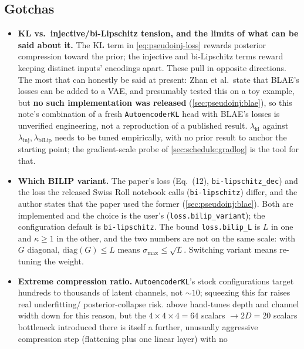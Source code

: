 \subsection{Gotchas}
\label{sec:pseudoinj:gotchas}
\begin{itemize}[leftmargin=1.5em]
\item \textbf{KL vs.\ injective/bi-Lipschitz tension, and the limits of what can be said about it.} The
      KL term in \cref{eq:pseudoinj-loss} rewards posterior compression toward the prior; the injective and
      bi-Lipschitz terms reward keeping distinct inputs' encodings apart. These pull in opposite
      directions. The most that can honestly be said at present: Zhan et al.\ state that BLAE's losses can
      be added to a VAE, and presumably tested this on a toy example, but \textbf{no such implementation
      was released} (\cref{sec:pseudoinj:blae}), so this note's combination of a fresh
      \texttt{AutoencoderKL} head with BLAE's losses is unverified engineering, not a reproduction of a
      published result. $\lambda_{\mathrm{kl}}$ against $\lambda_{\mathrm{inj}},\lambda_{\mathrm{biLip}}$
      needs to be tuned empirically, with no prior result to anchor the starting point; the gradient-scale
      probe of \cref{sec:schedule:gradlog} is the tool for that.
\item \textbf{Which BILIP variant.} The paper's loss (Eq.~(12), \texttt{bi-lipschitz\_dec})
      and the loss the released Swiss Roll notebook calls (\texttt{bi-lipschitz}) differ,
      and the author states that the paper used the former (\cref{sec:pseudoinj:blae}).
      Both are implemented and the choice is the user's
      (\texttt{loss.bilip\_variant}); the configuration default is \texttt{bi-lipschitz}.
      The bound \texttt{loss.bilip\_L} is $L$ in one and $\kappa\ge1$ in the other, and the
      two numbers are not on the same scale: with $G$ diagonal, $\mathrm{diag}(G)\le L$
      means $\sigma_{\max}\le\sqrt{L}$. Switching variant means re-tuning the weight.
\item \textbf{Extreme compression ratio.} \texttt{AutoencoderKL}'s stock configurations target hundreds 
      to thousands of latent channels, not $\sim\!10$; squeezing this far raises real underfitting/
      posterior-collapse risk.  above hand-tunes depth and channel width down 
      for this reason, but the $4\times4\times4=64$ scalars $\to2D=20$ scalars bottleneck introduced there 
      is itself a 
      further, unusually aggressive compression step (flattening plus one linear layer) with no 

\end{itemize}
